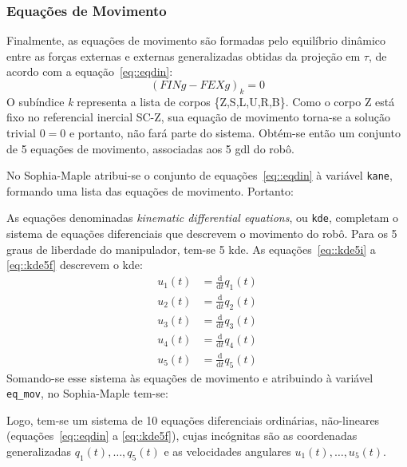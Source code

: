 \subsubsection{Equações de Movimento}

Finalmente, as equações de movimento são formadas pelo equilíbrio dinâmico entre
as forças externas e externas generalizadas obtidas da projeção em $\tau$, de
acordo com a equação~\ref{eq::eqdin}:
%
\begin{equation}
	(FINg - FEXg)_{k} = 0 \label{eq::eqdin}
\end{equation}
%
O subíndice \textit{k} representa a lista de corpos \{Z,S,L,U,R,B\}. Como o
corpo Z está fixo no referencial inercial SC-Z, sua equação de movimento
torna-se a solução trivial $0=0$ e portanto, não fará parte do sistema. Obtém-se
então um conjunto de 5 equações de movimento, associadas aos 5 gdl do robô.

No Sophia-Maple atribui-se o conjunto de equações~\ref{eq::eqdin} à
variável \texttt{kane}, formando uma lista das equações de movimento. Portanto:

\medskip {} \medskip

As equações denominadas \textit{kinematic differential equations}, ou
\texttt{kde}, completam o sistema de equações diferenciais que descrevem o
movimento do robô.
Para os 5 graus de liberdade do manipulador, tem-se 5 kde. As
equações~\ref{eq::kde5i} a \ref{eq::kde5f} descrevem o kde:
%
\begin{align}
	u_{1}(t) &= \frac{\mathrm{d} }{\mathrm{d} t}q_{1}(t) \label{eq::kde5i} \\
	u_{2}(t) &= \frac{\mathrm{d} }{\mathrm{d} t}q_{2}(t) \\
	u_{3}(t) &= \frac{\mathrm{d} }{\mathrm{d} t}q_{3}(t) \\
	u_{4}(t) &= \frac{\mathrm{d} }{\mathrm{d} t}q_{4}(t) \\
	u_{5}(t) &= \frac{\mathrm{d} }{\mathrm{d} t}q_{5}(t) \label{eq::kde5f}	
\end{align}
%
Somando-se esse sistema às equações de movimento e atribuindo à variável
\texttt{eq\_mov}, no Sophia-Maple tem-se:

\medskip {} \medskip

Logo, tem-se um sistema de 10 equações diferenciais ordinárias, não-lineares
(equações~\ref{eq::eqdin} a \ref{eq::kde5f}), cujas incógnitas são as
coordenadas generalizadas $q_{1}(t),\ldots, q_{5}(t)$ e as velocidades angulares
$u_{1}(t),\ldots, u_{5}(t)$.

